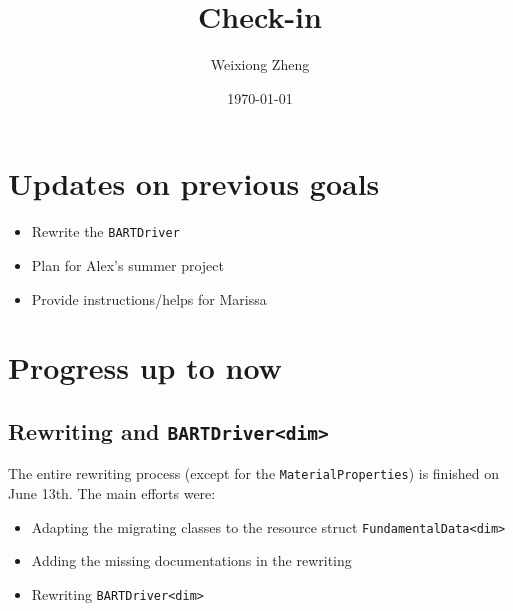 \documentclass{article}
\title{Check-in} %
\author{Weixiong Zheng} %
\date{\today} %
\begin{document}
\maketitle %

\section{Updates on previous goals}
\begin{itemize}
	\item Rewrite the {\tt BARTDriver}
	\item Plan for Alex's summer project
	\item Provide instructions/helps for Marissa
\end{itemize}
\section{Progress up to now}
\subsection{Rewriting and {\tt BARTDriver<dim>}}
The entire rewriting process (except for the {\tt MaterialProperties}) is finished on June 13th. The main efforts were:
\begin{itemize}
	\item Adapting the migrating classes to the resource struct 
	{\tt FundamentalData<dim>}
	\item Adding the missing documentations in the rewriting
	\item Rewriting {\tt BARTDriver<dim>}
\end{itemize}
\end{document}
